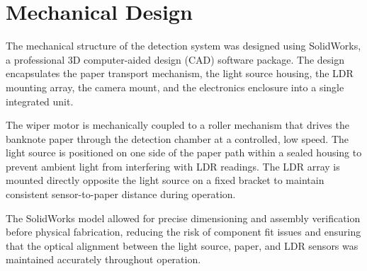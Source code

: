 \section{Mechanical Design}

The mechanical structure of the detection system was designed using SolidWorks, a professional 3D computer-aided design (CAD) software package. The design encapsulates the paper transport mechanism, the light source housing, the LDR mounting array, the camera mount, and the electronics enclosure into a single integrated unit.

The wiper motor is mechanically coupled to a roller mechanism that drives the banknote paper through the detection chamber at a controlled, low speed. The light source is positioned on one side of the paper path within a sealed housing to prevent ambient light from interfering with LDR readings. The LDR array is mounted directly opposite the light source on a fixed bracket to maintain consistent sensor-to-paper distance during operation.

The SolidWorks model allowed for precise dimensioning and assembly verification before physical fabrication, reducing the risk of component fit issues and ensuring that the optical alignment between the light source, paper, and LDR sensors was maintained accurately throughout operation.
